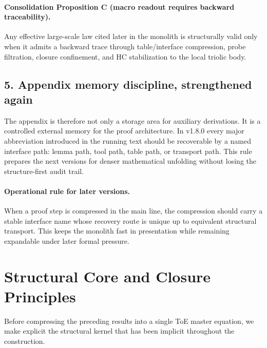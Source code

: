 \paragraph{Consolidation Proposition C (macro readout requires backward traceability).}
Any effective large-scale law cited later in the monolith is structurally valid only
when it admits a backward trace through table/interface compression, probe
filtration, closure confinement, and HC stabilization to the local triolic body.

\subsection*{5. Appendix memory discipline, strengthened again}
The appendix is therefore not only a storage area for auxiliary derivations. It is
a controlled external memory for the proof architecture. In v1.8.0 every major
abbreviation introduced in the running text should be recoverable by a named
interface path: lemma path, tool path, table path, or transport path. This rule
prepares the next versions for denser mathematical unfolding without losing the
structure-first audit trail.

\paragraph{Operational rule for later versions.}
When a proof step is compressed in the main line, the compression should carry a
stable interface name whose recovery route is unique up to equivalent structural
transport. This keeps the monolith fast in presentation while remaining expandable
under later formal pressure.

\section{Structural Core and Closure Principles}
\label{sec:structural-core}

Before compressing the preceding results into a single ToE master equation, we
make explicit the structural kernel that has been implicit throughout the
construction.

